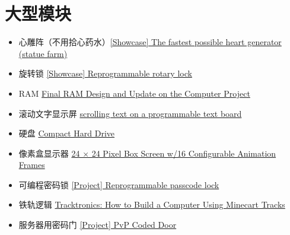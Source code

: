 \section{大型模块}
\begin{itemize}
\item 心雕阵（不用拾心药水）\href{https://forums.terraria.org/index.php?threads/showcase-the-fastest-possible-heart-generator-statue-farm.79848/}{[Showcase] The fastest possible heart generator (statue farm)}
\item 旋转锁 \href{https://forums.terraria.org/index.php?threads/showcase-reprogrammable-rotary-lock.75832/}{[Showcase] Reprogrammable rotary lock}
\item RAM \href{https://forums.terraria.org/index.php?threads/final-ram-design-and-update-on-the-computer-project.75973/}{Final RAM Design and Update on the Computer Project}
\item 滚动文字显示屏 \href{https://forums.terraria.org/index.php?threads/scrolling-text-on-a-programmable-text-board.76008/}{scrolling text on a programmable text board}
\item 硬盘 \href{https://forums.terraria.org/index.php?threads/compact-hard-drive.76091/}{Compact Hard Drive}
\item 像素盒显示器 \href{https://forums.terraria.org/index.php?threads/24-%C3%97-24-pixel-box-screen-w-16-configurable-animation-frames.76325/}{24 × 24 Pixel Box Screen w/16 Configurable Animation Frames}
\item 可编程密码锁 \href{https://forums.terraria.org/index.php?threads/project-reprogrammable-passcode-lock.76352/}{[Project] Reprogrammable passcode lock}
\item 铁轨逻辑 \href{https://forums.terraria.org/index.php?threads/tracktronics-how-to-build-a-computer-using-minecart-tracks.15202/}{Tracktronics: How to Build a Computer Using Minecart Tracks}
\item 服务器用密码门 \href{https://forums.terraria.org/index.php?threads/project-pvp-coded-door.77068/}{[Project] PvP Coded Door}
\end{itemize}

